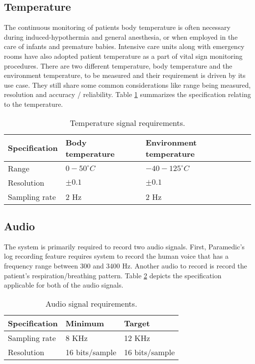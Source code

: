 \subsection{Temperature}
The continuous monitoring of patients body temperature is often necessary during induced-hypothermia and general anesthesia, or when employed in the care of infants and premature babies. Intensive care units along with emergency rooms have also adopted patient temperature as a part of vital sign monitoring procedures. There are two different temperature, body temperature and the environment temperature, to be measured and their requirement is driven by its use case. They still share some common considerations like range being measured, resolution and accuracy / reliability. Table \ref{table:tmp} summarizes the specification relating to the temperature. 
\begin{table}[h]
	\centering
	\begin{tabular}{|l|l|l|}
		\hline
		Specification & Body temperature & Environment temperature \\
		\hline
		Range & $0-50 ^{\circ}C$ & $-40-125 ^{\circ}C$ \\
		Resolution & $\pm 0.1$ & $\pm 0.1$\\
		Sampling rate & 2 Hz & 2 Hz \\
		\hline
	\end{tabular}
	\caption{Temperature signal requirements.}
	\label{table:tmp}
\end{table}

\subsection{Audio}
The system is primarily required to record two audio signals. First, Paramedic's log recording feature requires system to record the human voice that has a frequency range between 300 and 3400 Hz. Another audio to record is record the patient's respiration/breathing pattern. Table \ref{table:aud} depicts the specification applicable for both of the audio signals. 

\begin{table}[h]
	\centering
	\begin{tabular}{|l|l|l|}
		\hline
		Specification & Minimum & Target \\
		\hline
		Sampling rate &  8 KHz & 12 KHz \\
		Resolution & 16 bits/sample & 16 bits/sample \\
		\hline
	\end{tabular}
	\caption{Audio signal requirements.}
	\label{table:aud}
\end{table}
